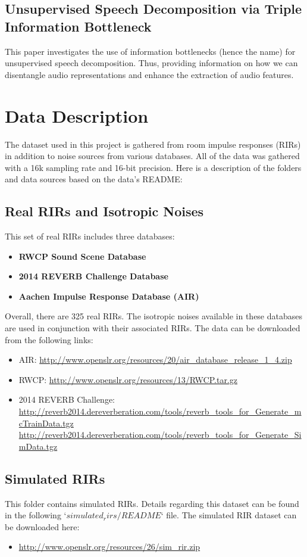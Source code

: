 \documentclass{article}
\begin{document}
\subsection{Unsupervised Speech Decomposition via Triple Information Bottleneck}
\citet{speech_decomposition} This paper investigates the use of information bottlenecks (hence the name) for unsupervised speech decomposition. Thus, providing information on how we can disentangle audio representations and enhance the extraction of audio features.


\section{Data Description}
\label{sec:data_description}
The dataset used in this project is gathered from room impulse responses (RIRs) in addition to noise sources from various databases. All of the data was gathered with a 16k sampling rate and 16-bit precision. Here is a description of the folders and data sources based on the data's README:

\subsection{Real RIRs and Isotropic Noises}
This set of real RIRs includes three databases:
\begin{itemize}
  \item \textbf{RWCP Sound Scene Database}
  \item \textbf{2014 REVERB Challenge Database}
  \item \textbf{Aachen Impulse Response Database (AIR)}
\end{itemize}
Overall, there are 325 real RIRs. The isotropic noises available in these databases are used in conjunction with their associated RIRs. The data can be downloaded from the following links:
\begin{itemize}
\item AIR: \url{http://www.openslr.org/resources/20/air_database_release_1_4.zip}
    \item RWCP: \url{http://www.openslr.org/resources/13/RWCP.tar.gz}
    \item 2014 REVERB Challenge: \url{http://reverb2014.dereverberation.com/tools/reverb_tools_for_Generate_mcTrainData.tgz} \\
    \url{http://reverb2014.dereverberation.com/tools/reverb_tools_for_Generate_SimData.tgz}
\end{itemize}

\subsection{Simulated RIRs}
This folder contains simulated RIRs. Details regarding this dataset can be found in the following `$simulated_rirs/README$` file. The simulated RIR dataset can be downloaded here:
\begin{itemize}
\item \url{http://www.openslr.org/resources/26/sim_rir.zip}
\end{itemize}
\end{document}
